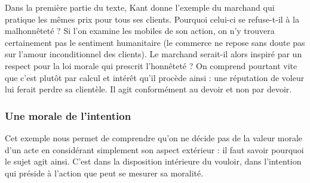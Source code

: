 Dans la première partie du texte, Kant donne l’exemple du marchand qui pratique
les mêmes prix pour tous ses clients. Pourquoi celui-ci se refuse-t-il à la malhonnêteté ?
Si l’on examine les mobiles de son action, on n’y trouvera certainement
pas le sentiment humanitaire (le commerce ne repose sans doute pas sur l'amour
inconditionnel des clients). Le marchand serait-il alors inspiré par un respect pour
la loi morale qui prescrit l'honnêteté ? On comprend pourtant vite que c'est plutôt
par calcul et intérêt qu'il procède ainsi : une réputation de voleur lui ferait perdre
sa clientèle. Il agit conformément au devoir et non par devoir.

\subsubsection{Une morale de l'intention}

Cet exemple nous permet de comprendre qu'on ne décide pas de la valeur morale
d’un acte en considérant simplement son aspect extérieur : il faut savoir pourquoi
le sujet agit ainsi. C’est dans la disposition intérieure du vouloir, dans l'intention
qui préside à l’action que peut se mesurer sa moralité.


